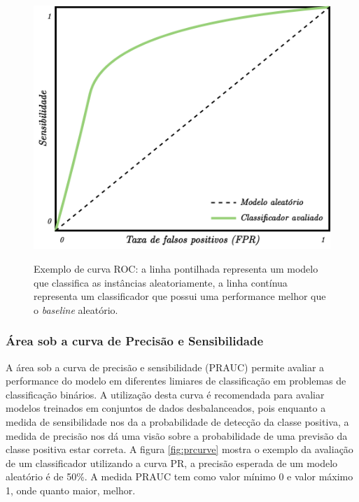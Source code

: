 \begin{figure}[htbp]
	\centering
	\caption{Exemplo de curva ROC: a linha pontilhada representa um modelo que classifica as instâncias aleatoriamente, a linha contínua representa um classificador que possui uma performance melhor que o \textit{baseline} aleatório.}
		\includegraphics[scale=.20]{imagens/auroc.png}
	\label{fig:aucroc}
\end{figure}

\subsubsection{Área sob a curva de Precisão e Sensibilidade}

A área sob a curva de precisão e sensibilidade (PRAUC) permite avaliar a performance do modelo em diferentes limiares de classificação em problemas de classificação binários.
A utilização desta curva é recomendada para avaliar modelos treinados em conjuntos de dados desbalanceados, pois enquanto a medida de sensibilidade nos da a probabilidade de detecção da classe positiva, a medida de precisão nos dá uma visão sobre a probabilidade de uma previsão da classe positiva estar correta. A figura \ref{fig:prcurve} mostra o exemplo da avaliação de um classificador utilizando a curva PR, a precisão esperada de um modelo aleatório é de 50\%. A medida PRAUC tem como valor mínimo 0 e valor máximo 1, onde quanto maior, melhor.

